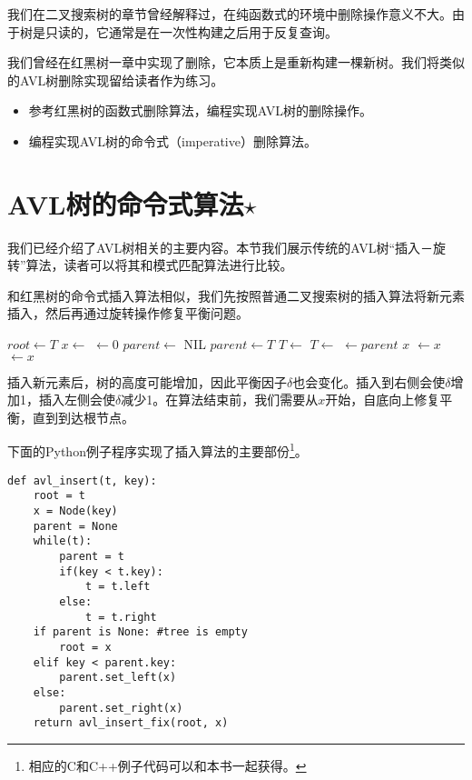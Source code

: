 \documentclass[UTF8]{article}
\begin{document}
我们在二叉搜索树的章节曾经解释过，在纯函数式的环境中删除操作意义不大。由于树是只读的，它通常是在一次性构建之后用于反复查询。

我们曾经在红黑树一章中实现了删除，它本质上是重新构建一棵新树。我们将类似的AVL树删除实现留给读者作为练习。

\begin{Exercise}

\begin{itemize}
\item 参考红黑树的函数式删除算法，编程实现AVL树的删除操作。

\item 编程实现AVL树的命令式（imperative）删除算法。
\end{itemize}

\end{Exercise}

\section{AVL树的命令式算法$\star$}

我们已经介绍了AVL树相关的主要内容。本节我们展示传统的AVL树“插入－旋转”算法，读者可以将其和模式匹配算法进行比较。

和红黑树的命令式插入算法相似，我们先按照普通二叉搜索树的插入算法将新元素插入，然后再通过旋转操作修复平衡问题。

\begin{algorithmic}[1]
  \State $root \gets T$
  \State $x \gets$ 
  \State {} $\gets 0$
  \State $parent \gets$ NIL
    \State $parent \gets T$
      \State $T \gets $ 
    \Else
      \State $T \gets $ 
    \EndIf
  \EndWhile
  \State {} $\gets parent$
   
    \State \Return $x$
    \State {} $\gets x$
  \Else
    \State {} $\gets x$
  \EndIf
  \State \Return {}
\EndFunction
\end{algorithmic}

插入新元素后，树的高度可能增加，因此平衡因子$\delta$也会变化。插入到右侧会使$\delta$增加1，插入左侧会使$\delta$减少1。在算法结束前，我们需要从$x$开始，自底向上修复平衡，直到到达根节点。

下面的Python例子程序实现了插入算法的主要部份\footnote{相应的C和C++例子代码可以和本书一起获得。}。
\lstset{language=Python}
\begin{lstlisting}
def avl_insert(t, key):
    root = t
    x = Node(key)
    parent = None
    while(t):
        parent = t
        if(key < t.key):
            t = t.left
        else:
            t = t.right
    if parent is None: #tree is empty
        root = x
    elif key < parent.key:
        parent.set_left(x)
    else:
        parent.set_right(x)
    return avl_insert_fix(root, x)
\end{lstlisting}
\end{document}
